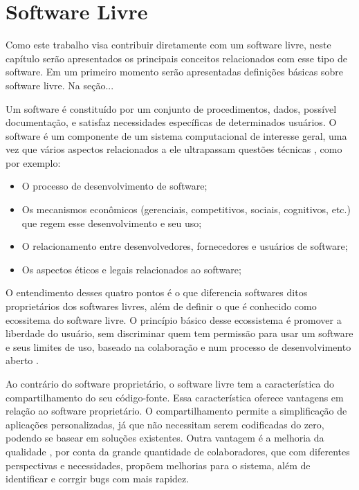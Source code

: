 \chapter{Software Livre}

Como este trabalho visa contribuir diretamente com um software livre, neste capítulo serão apresentados os principais conceitos relacionados com esse tipo de software. Em um primeiro momento serão apresentadas definições básicas sobre software livre. Na seção...%

Um software é constituído por um conjunto de procedimentos, dados, possível documentação, e satisfaz necessidades específicas de determinados usuários. O software é um componente de um sistema computacional de interesse geral, uma vez que vários aspectos relacionados a ele ultrapassam questões técnicas \cite{meirelles2013metrics}, como por exemplo: 

\begin{itemize}
\item O processo de desenvolvimento de software;
\item Os mecanismos econômicos (gerenciais, competitivos, sociais, cognitivos, etc.) que regem esse desenvolvimento e seu uso;
\item O relacionamento entre desenvolvedores, fornecedores e usuários de software;
\item Os aspectos éticos e legais relacionados ao software;
\end{itemize}

O entendimento desses quatro pontos é o que diferencia softwares ditos proprietários dos softwares livres, além de definir o que é conhecido como ecossitema do software livre. O princípio básico desse ecossistema é promover a liberdade do usuário, sem discriminar quem tem permissão para usar um software e seus limites de uso, baseado na colaboração e num processo de desenvolvimento aberto \cite{meirelles2013metrics}.

Ao contrário do software proprietário, o software livre tem a característica do compartilhamento do seu código-fonte. Essa característica oferece vantagens em relação ao software proprietário. O compartilhamento permite a simplificação de aplicações personalizadas, já que não necessitam serem codificadas do zero, podendo se basear em soluções existentes. Outra vantagem é a melhoria da qualidade \cite{Raymond, 1999}, por conta da grande quantidade de colaboradores, que com diferentes perspectivas e necessidades, propõem melhorias para o sistema, além de identificar e corrgir bugs com mais rapidez.


